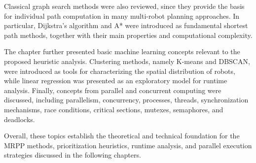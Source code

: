 Classical graph search methods were also reviewed, since they provide the basis for individual path
computation in many multi-robot planning approaches. In particular, Dijkstra's algorithm and A*
were introduced as fundamental shortest path methods, together with their main properties and
computational complexity.

The chapter further presented basic machine learning concepts relevant to the proposed heuristic
analysis. Clustering methods, namely K-means and DBSCAN, were introduced as tools for
characterizing the spatial distribution of robots, while linear regression was presented as an
exploratory model for runtime analysis. Finally, concepts from parallel and concurrent computing
were discussed, including parallelism, concurrency, processes, threads, synchronization mechanisms,
race conditions, critical sections, mutexes, semaphores, and deadlocks.

Overall, these topics establish the theoretical and technical foundation for the MRPP methods,
prioritization heuristics, runtime analysis, and parallel execution strategies discussed in the
following chapters.